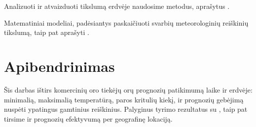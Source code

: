 \documentclass{article}
\begin{document}
Analizuoti ir atvaizduoti tikslumą erdvėje naudosime metodus, aprašytus
\cite{verification2015}.

Matematiniai modeliai, padėsiantys paskaičiuoti svarbių meteorologinių
reiškinių tikslumą, taip pat aprašyti \cite{verification2015}.

\section{Apibendrinimas}

Šis darbas ištirs komercinių oro tiekėjų orų prognozių patikimumą laike ir
erdvėje: minimalią, maksimalią temperatūrą, paros kritulių kiekį, ir prognozių
gebėjimą nuspėti ypatingus gamtinius reiškinius. Palyginus tyrimo rezultatus su
\cite{rose2017analysis}, taip pat tirsime ir prognozių efektyvumą per
geografinę lokaciją.

\printbibliography
\end{document}
